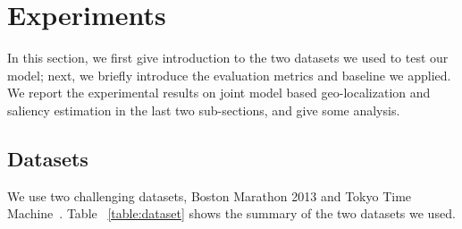 \section{Experiments}
\label{sec:expr}

In this section, we first give introduction to the two datasets we used to test our model; 
next, we briefly introduce the evaluation metrics and baseline we applied.
We report the experimental results on joint model based geo-localization and saliency estimation in the last two sub-sections, and give some analysis.

\subsection{Datasets}
We use two challenging datasets, Boston Marathon 2013\cite{chen2016boston} and Tokyo Time Machine~\cite{torii201524, Arandjelovic16}. 
Table ~\ref{table:dataset} shows the summary of the two datasets we used.
